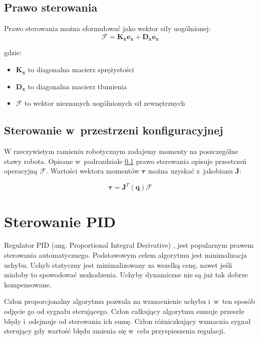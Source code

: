 \subsection{Prawo sterowania}
\label{sec:impedancyjne}

Prawo sterowania można sformułować  jako wektor siły uogólnionej:
\begin{equation}
\boldsymbol{\mathcal{F}} = \boldsymbol{K_x}\boldsymbol{e_x} + \boldsymbol{D_x}\dot{\boldsymbol{e_x}}
\end{equation}

gdzie:
\begin{itemize}
\item $\boldsymbol{K_x}$ to diagonalna macierz sprężystości
\item $\boldsymbol{D_x}$ to diagonalna macierz tłumienia
\item $\boldsymbol{\mathcal{F}}$ to wektor nieznanych uogólnionych sił zewnętrznych
\end{itemize}

\subsection{Sterowanie w~przestrzeni konfiguracyjnej}
\label{chap:jakobian}
W rzeczywistym ramieniu robotycznym zadajemy momenty na poszczególne stawy robota. Opisane w~podrozdziale \ref{sec:impedancyjne} prawo sterowania opisuje przestrzeń operacyjną $\boldsymbol{\mathcal{F}}$.  Wartości wektora momentów $\boldsymbol{\tau}$ można uzyskać z~jakobianu $\boldsymbol{J}$:

\begin{equation}
\boldsymbol{\tau} = \boldsymbol{J}^T(\boldsymbol{q})\boldsymbol{\mathcal{F}}
\end{equation}

\section{Sterowanie PID}
\label{chap:key}
Regulator PID (ang. Proportional Integral Derivative) \cite{bib:pidTito}, \cite{bib:pidMimo} jest popularnym prawem sterowania automatycznego. Podstawowym celem algorytmu jest minimalizacja uchybu. Uchyb statyczny jest minimalizowany za wszelką cenę, nawet jeśli miałoby to spowodować uszkodzenia. Uchyby dynamiczne nie są już tak dobrze kompensowane.

Człon proporcjonalny algorytmu pozwala na wzmocnienie uchybu i~w~ten sposób odjęcie go od sygnału sterującego. Człon całkujący algorytmu sumuje przeszłe błędy i~odejmuje od sterowania ich sumę. Człon różniczkujący wzmacnia sygnał sterujący gdy wartość błędu zmienia się w~celu przyspieszenia regulacji.
